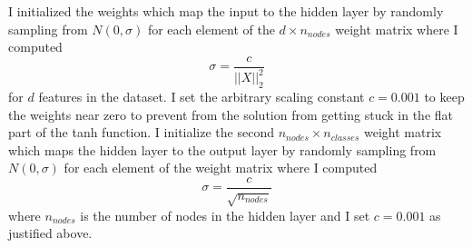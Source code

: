 \documentclass[12pt]{amsart}
\begin{document}
I initialized the weights which map the input to the hidden layer by randomly sampling from $N(0,\sigma)$ for each element of the $d \times n_{nodes}$ weight matrix where I computed 
\begin{equation}
\sigma = \frac{c}{||X||^2_2}
\end{equation}
for $d$ features in the dataset.  I set the arbitrary scaling constant $c = 0.001$ to keep the weights near zero to prevent from the solution from getting stuck in the flat part of the tanh function.  I initialize the second $n_{nodes} \times n_{classes}$ weight matrix which maps the hidden layer to the output layer by randomly sampling from $N(0,\sigma)$ for each element of the weight matrix where I computed 
\begin{equation}
\sigma = \frac{c}{\sqrt{n_{nodes}}}
\end{equation}
where $n_{nodes}$ is the number of nodes in the hidden layer and I set $c = 0.001$ as justified above.
\end{document}
